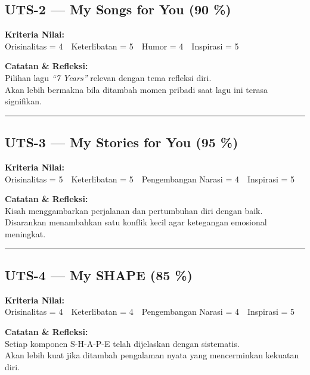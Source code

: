 \documentclass[
  letterpaper,
  DIV=11,
  numbers=noendperiod]{scrreprt}
\begin{document}
\subsection*{UTS-2 --- My Songs for You (90
\%)}\label{uts-2-my-songs-for-you-90}

\textbf{Kriteria Nilai:}\\
Orisinalitas = 4 Keterlibatan = 5 Humor = 4 Inspirasi = 5

\textbf{Catatan \& Refleksi:}\\
Pilihan lagu \emph{``7 Years''} relevan dengan tema refleksi diri.\\
Akan lebih bermakna bila ditambah momen pribadi saat lagu ini terasa
signifikan.

\begin{center}\rule{0.5\linewidth}{0.5pt}\end{center}

\subsection*{UTS-3 --- My Stories for You (95
\%)}\label{uts-3-my-stories-for-you-95}

\textbf{Kriteria Nilai:}\\
Orisinalitas = 5 Keterlibatan = 5 Pengembangan Narasi = 4 Inspirasi = 5

\textbf{Catatan \& Refleksi:}\\
Kisah menggambarkan perjalanan dan pertumbuhan diri dengan baik.\\
Disarankan menambahkan satu konflik kecil agar ketegangan emosional
meningkat.

\begin{center}\rule{0.5\linewidth}{0.5pt}\end{center}

\subsection*{UTS-4 --- My SHAPE (85 \%)}\label{uts-4-my-shape-85}

\textbf{Kriteria Nilai:}\\
Orisinalitas = 4 Keterlibatan = 4 Pengembangan Narasi = 4 Inspirasi = 5

\textbf{Catatan \& Refleksi:}\\
Setiap komponen S-H-A-P-E telah dijelaskan dengan sistematis.\\
Akan lebih kuat jika ditambah pengalaman nyata yang mencerminkan
kekuatan diri.
\end{document}
